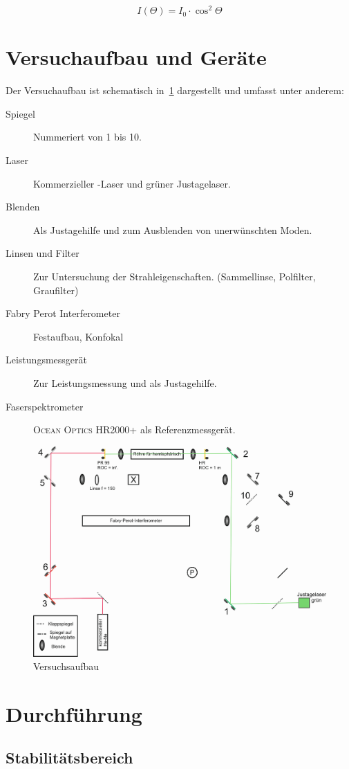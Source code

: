 \documentclass[slug=GL, room=HZDR\ Dresden/Rossendorf\,\ Geb.\ 620/123, supervisor=Martin\ Rehwald;\, Tim\ Ziegler]{../../Lab_Report_LaTeX/lab_report}
\newcommand{\hne}{\ce{HeNe}-Laser}
\begin{document}
\begin{equation}
  \label{eq:malus}
  I(\Theta)=I_0\cdot \cos^2{\Theta}
\end{equation}

\section{Versuchaufbau und Ger\"ate}
\label{sec:versuaufb}

Der Versuchaufbau ist schematisch in~\ref{fig:aufb} dargestellt und umfasst unter anderem:

\begin{description}
\item[Spiegel] Nummeriert von 1 bis 10.
\item[Laser] Kommerzieller \hne{} und gr\"uner Justagelaser.
\item[Blenden] Als Justagehilfe und zum Ausblenden von unerw\"unschten Moden.
\item[Linsen und Filter] Zur Untersuchung der Strahleigenschaften. (Sammellinse, Polfilter, Graufilter)
\item[Fabry Perot Interferometer] Festaufbau, Konfokal
\item[Leistungsmessger\"at] Zur Leistungsmessung und als Justagehilfe.
\item[Faserspektrometer] \textsc{Ocean Optics HR2000+} als Referenzmessger\"at.
\end{description}


\begin{figure}[H]\centering
  \includegraphics[width=.5\columnwidth]{aufb.png}
  \caption[Aufbau]{Versuchsaufbau}
  \label{fig:aufb}
\end{figure}



\section{Durchf\"uhrung}
\label{sec:durch}

\subsection{Stabilit\"atsbereich}
\label{sec:stabber}
\end{document}
